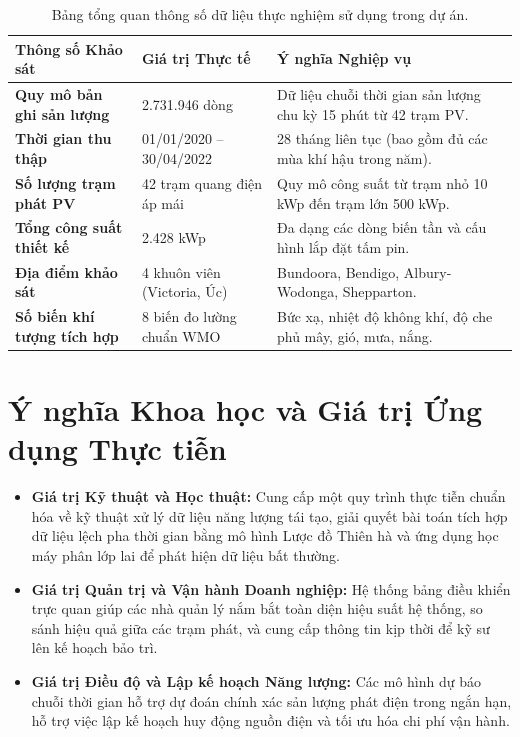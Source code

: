 \documentclass[12pt, a4paper]{report}
\begin{document}
\begin{table}[H]
\centering
\small
\renewcommand{\arraystretch}{1.25}
\begin{tabularx}{\textwidth}{@{} l l X @{}}
\toprule
\textbf{Thông số Khảo sát} & \textbf{Giá trị Thực tế} & \textbf{Ý nghĩa Nghiệp vụ} \\
\midrule
\textbf{Quy mô bản ghi sản lượng} & 2.731.946 dòng & Dữ liệu chuỗi thời gian sản lượng chu kỳ 15 phút từ 42 trạm PV. \\
\textbf{Thời gian thu thập} & 01/01/2020 -- 30/04/2022 & 28 tháng liên tục (bao gồm đủ các mùa khí hậu trong năm). \\
\textbf{Số lượng trạm phát PV} & 42 trạm quang điện áp mái & Quy mô công suất từ trạm nhỏ 10 kWp đến trạm lớn 500 kWp. \\
\textbf{Tổng công suất thiết kế} & 2.428 kWp & Đa dạng các dòng biến tần và cấu hình lắp đặt tấm pin. \\
\textbf{Địa điểm khảo sát} & 4 khuôn viên (Victoria, Úc) & Bundoora, Bendigo, Albury-Wodonga, Shepparton. \\
\textbf{Số biến khí tượng tích hợp} & 8 biến đo lường chuẩn WMO & Bức xạ, nhiệt độ không khí, độ che phủ mây, gió, mưa, nắng. \\
\bottomrule
\end{tabularx}
\caption{Bảng tổng quan thông số dữ liệu thực nghiệm sử dụng trong dự án.}
\label{tab:dataset_summary}
\end{table}

\section{Ý nghĩa Khoa học và Giá trị Ứng dụng Thực tiễn}
\label{sec:ynghia}

\begin{itemize}[noitemsep]
    \item \textbf{Giá trị Kỹ thuật và Học thuật:} Cung cấp một quy trình thực tiễn chuẩn hóa về kỹ thuật xử lý dữ liệu năng lượng tái tạo, giải quyết bài toán tích hợp dữ liệu lệch pha thời gian bằng mô hình Lược đồ Thiên hà và ứng dụng học máy phân lớp lai để phát hiện dữ liệu bất thường.
    \item \textbf{Giá trị Quản trị và Vận hành Doanh nghiệp:} Hệ thống bảng điều khiển trực quan giúp các nhà quản lý nắm bắt toàn diện hiệu suất hệ thống, so sánh hiệu quả giữa các trạm phát, và cung cấp thông tin kịp thời để kỹ sư lên kế hoạch bảo trì.
    \item \textbf{Giá trị Điều độ và Lập kế hoạch Năng lượng:} Các mô hình dự báo chuỗi thời gian hỗ trợ dự đoán chính xác sản lượng phát điện trong ngắn hạn, hỗ trợ việc lập kế hoạch huy động nguồn điện và tối ưu hóa chi phí vận hành.
\end{itemize}
\end{document}
